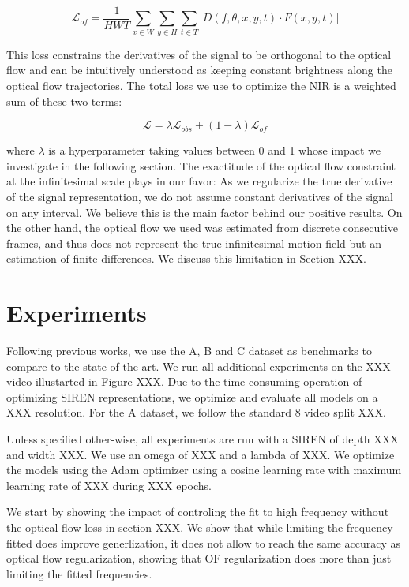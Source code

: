 \documentclass{article}
\begin{document}
\begin{equation}
\mathcal{L}_{of} = \frac{1}{HWT} \sum_{x \in W}\sum_{y \in H}\sum_{t \in T} | D(f, \theta, x, y, t) \cdot F(x, y, t) |
\end{equation}

This loss constrains the derivatives of the signal to be orthogonal to the optical flow and
can be intuitively understood as keeping constant brightness along the optical flow trajectories.
The total loss we use to optimize the NIR is a weighted sum of these two terms:

\begin{equation}
\mathcal{L} = \lambda \mathcal{L}_{obs} + (1-\lambda) \mathcal{L}_{of}
\end{equation}

where $\lambda$ is a hyperparameter taking values between 0 and 1 whose impact we investigate in the following section.
The exactitude of the optical flow constraint at the infinitesimal scale plays in our favor:
As we regularize the true derivative of the signal representation,
we do not assume constant derivatives of the signal on any interval.
We believe this is the main factor behind our positive results.
On the other hand, the optical flow we used was estimated from discrete consecutive frames,
and thus does not represent the true infinitesimal motion field but an estimation of finite differences.
We discuss this limitation in Section XXX.

\section{Experiments}

Following previous works, we use the A, B and C dataset as benchmarks to compare to the state-of-the-art.
We run all additional experiments on the XXX video illustarted in Figure XXX.
Due to the time-consuming operation of optimizing SIREN representations, we optimize and evaluate all models on a XXX resolution.
For the A dataset, we follow the standard 8 video split XXX.

Unless specified other-wise, all experiments are run with a SIREN of depth XXX and width XXX.
We use an omega of XXX and a lambda of XXX.
We optimize the models using the Adam optimizer using a cosine learning rate with maximum learning rate of XXX during XXX epochs.

We start by showing the impact of controling the fit to high frequency without the optical flow loss in section XXX.
We show that while limiting the frequency fitted does improve generlization, it does not allow to reach
the same accuracy as optical flow regularization, showing that OF regularization does more than just limiting the fitted frequencies.
\end{document}

